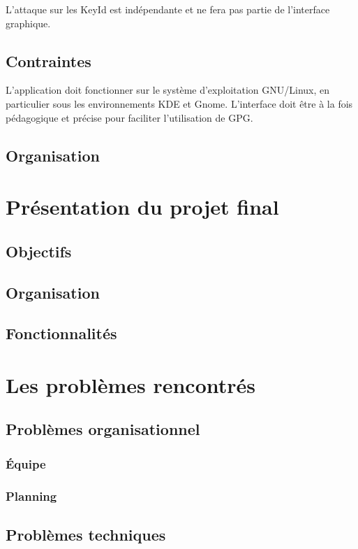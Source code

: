 \documentclass{../res/univ-projet}
\begin{document}
  \medbreak
  
  L'attaque sur les KeyId est indépendante et ne fera pas partie de l'interface graphique. 
  
  \subsection{Contraintes}
  
  L'application doit fonctionner sur le système d'exploitation GNU/Linux, en particulier sous les environnements KDE et Gnome.
  L'interface doit être à la fois pédagogique et précise pour faciliter l'utilisation de GPG. 
  
  \subsection{Organisation}

\section{Présentation du projet final}
  \subsection{Objectifs}
  \subsection{Organisation}
  \subsection{Fonctionnalités}


\section{Les problèmes rencontrés}

  \subsection{Problèmes organisationnel}
    \subsubsection{Équipe}
    \subsubsection{Planning}
    
  \subsection{Problèmes techniques}
\end{document}

